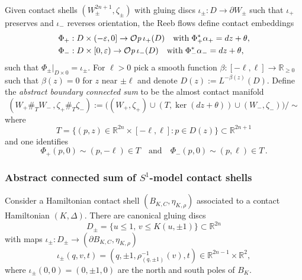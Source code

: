 \documentclass[12pt]{paper}
\theoremstyle{plain}
\theoremstyle{definition}
\newcommand{\p}{\partial}
\newcommand{\eps}{\varepsilon}
\newcommand{\R}{{\mathbb{R}}}
\def\Op{{\mathcal O}{\it p}\,}
\numberwithin{figure}{section}
\begin{document}
	Given contact shells $(W^{2n+1}_\pm, \zeta_\pm)$  with gluing discs $\iota_\pm: D \to \p W_\pm$
	such that $\iota_+$ preserves and $\iota_-$ reverses orientation, the Reeb flows define contact embeddings
	\begin{equation}\label{eq:Darboux-gluing}
	\begin{split}
	&\Phi_+: D \times (-\eps, 0] \to \Op \iota_+(D) \quad\mbox{with} \;\Phi_+^*\alpha_+ = dz + \theta,\\ 
	&	\Phi_-:  D \times [0, \eps) \to \Op \iota_-(D) \quad\mbox{with} \;  \Phi_-^*\alpha_- = dz + \theta, 
		\end{split}
	\end{equation}
	such that $\Phi_\pm|_{D \times 0} = \iota_\pm$.
	For $\ell > 0$ pick a  smooth function $\beta: [-\ell,\ell]\to\R_{\geq 0}$ such that $\beta(z)=0$ for $z$ near $\pm\ell$
	and denote  $D(z):=L^{-\beta(z)}(D)$. %
	Define the \emph{abstract boundary connected sum} to be the almost contact manifold
	\begin{equation}\label{e:ABCS}
		(W_+ \#_{T} W_-\,, \zeta_+ \#_{T} \zeta_-) := 
		\Big((W_+, \zeta_+) \cup (T, \ker(dz+\theta)) \cup (W_-, \zeta_-)\Big)/\sim
	\end{equation}
	where
	\begin{equation}\label{e:Tube}
		T = \{(p,z) \in \R^{2n} \times [-\ell, \ell]: p \in D(z)\} \subset \R^{2n+1}
	\end{equation}
	and one identifies 
	$$
		\Phi_+(p, 0) \sim (p, -\ell) \in T \quad\mbox{and}\quad \Phi_-(p,0) \sim (p,\ell) \in T\,.
	$$


\subsubsection{Abstract connected sum of $S^1$-model contact shells}\label{s:S1ConnectSum}

Consider a Hamiltonian contact shell $(B_{K,C}, \eta_{K, \rho})$
associated to a contact Hamiltonian $(K, \Delta)$.
There are canonical gluing discs
$$
	D_{\pm} = \{ u \leq 1,\, v \leq K(u,\pm 1)\} \subset \R^{2n}
$$
with maps $\iota_{\pm}: D_{\pm} \to (\p B_{K,C}, \eta_{K, \rho})$
$$
	 \iota_\pm(q, v, t)
	= (q, \pm 1, \rho_{(q,\pm1)}^{-1}(v), t) \in \R^{2n-1} \times \R^{2},
$$
where $\iota_\pm(0, 0) = (0, \pm1, 0)$ are the north and south poles of $B_K$.
\end{document}
